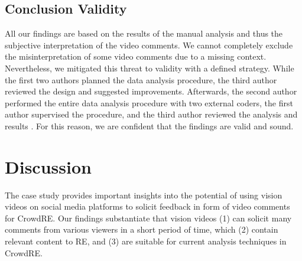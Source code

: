 \documentclass[conference]{IEEEtran}
\begin{document}
{\begin{table}[htbp]
	\renewcommand{\arraystretch}{1.3}
	\captionsetup{justification=justified}
	\centering
	\caption{Inter-rater reliability between the two coders}
	\label{tbl:kappa}
\end{table}

\subsection{Conclusion Validity}
All our findings are based on the results of the manual analysis and thus the subjective interpretation of the video comments. We cannot completely exclude the misinterpretation of some video comments due to a missing context. Nevertheless, we mitigated this threat to validity with a defined strategy. While the first two authors planned the data analysis procedure, the third author reviewed the design and suggested improvements. Afterwards, the second author performed the entire data analysis procedure with two external coders, the first author supervised the procedure, and the third author reviewed the analysis and results \cite{Kristo.2021a}. For this reason, we are confident that the findings are valid and sound.

\section{Discussion}
\label{sec:discussion}
The case study provides important insights into the potential of using vision videos on social media platforms to solicit feedback in form of video comments for CrowdRE. Our findings substantiate that vision videos (1) can solicit many comments from various viewers in a short period of time, which (2) contain relevant content to RE, and (3) are suitable for current analysis techniques in CrowdRE.

}
\end{document}
